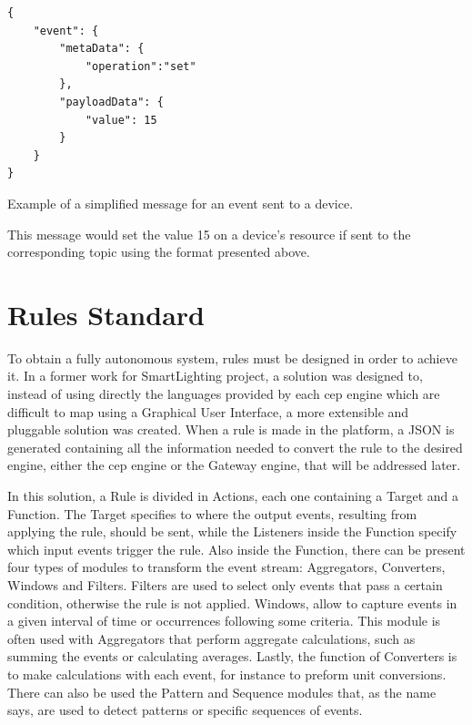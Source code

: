 \begin{listing}[H]
\begin{verbatim}
{
    "event": {
        "metaData": {
            "operation":"set"
        }, 
        "payloadData": {
            "value": 15 
        }
    } 
}

\end{verbatim}
\caption{Example of a simplified message for an event sent to a device.}
\label{snippet:todevice}
\end{listing}

This message would set the value 15 on a device's resource if sent to the corresponding topic using the format presented above.

\section{Rules Standard}
\label{implementation:rules}


To obtain a fully autonomous system, rules must be designed in order to achieve it. In a former work for SmartLighting project\cite{helder}, a solution was designed to, instead of using directly the languages provided by each \ac{cep} engine which are difficult to map using a Graphical User Interface, a more extensible and pluggable solution was created. When a rule is made in the platform, a JSON is generated containing all the information needed to convert the rule to the desired engine, either the \ac{cep} engine or the Gateway engine, that will be addressed later.

In this solution, a Rule is divided in Actions, each one containing a Target and a Function. The Target specifies to where the output events, resulting from applying the rule, should be sent, while the Listeners inside the Function specify which input events trigger the rule. Also inside the Function, there can be present four types of modules to transform the event stream: Aggregators, Converters, Windows and Filters. Filters are used to select only events that pass a certain condition, otherwise the rule is not applied. Windows, allow to capture events in a given interval of time or occurrences following some criteria. This module is often used with Aggregators that perform aggregate calculations, such as summing the events or calculating averages. Lastly, the function of Converters is to make calculations with each event, for instance to preform unit conversions. There can also be used the Pattern and Sequence modules that, as the name says, are used to detect patterns or specific sequences of events.


